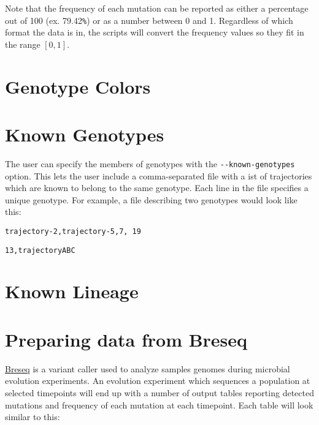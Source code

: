 \documentclass{report}
\begin{document}
Note that the frequency of each mutation can be reported as either a percentage out of 100 (ex. 79.42\verb|%|) or as a number between 0 and 1.
Regardless of which format the data is in, the scripts will convert the frequency values so they fit in the range $[0,1]$.


\section{Genotype Colors}

\section{Known Genotypes}
The user can specify the members of genotypes with the \verb|--known-genotypes| option. 
This lets the user include a comma-separated file with a ist of trajectories which are known to belong to the same genotype.
Each line in the file specifies a unique genotype.
For example, a file describing two genotypes would look like this:
\newline
\begin{boxedminipage}[b]{7cm}
\begin{verbatim}trajectory-2,trajectory-5,7, 19\end{verbatim}
\begin{verbatim}13,trajectoryABC\end{verbatim}
    
\end{boxedminipage}
\section{Known Lineage}


\section{Preparing data from Breseq}
\href{http://barricklab.org/twiki/bin/view/Lab/ToolsBacterialGenomeResequencing}{Breseq}
is a variant caller used to analyze samples genomes during microbial evolution experiments. 
An evolution experiment which sequences a population at selected timepoints will end up with a number of output tables reporting detected mutations and 
frequency of each mutation at each timepoint.
 Each table will look similar to this:
\end{document}
